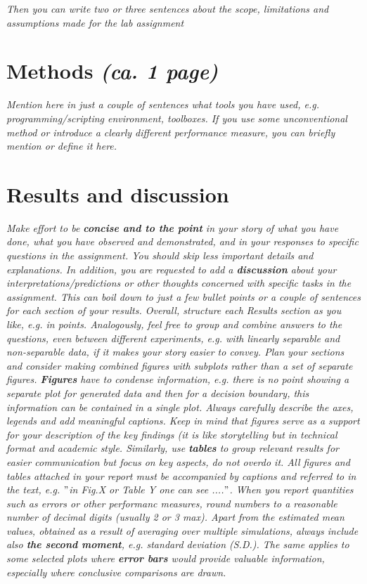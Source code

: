 \documentclass[a4paper]{article}
\begin{document}
\textit{Then you can write two or three sentences about the scope, limitations and assumptions made for the lab assignment}\\

\section{Methods \normalsize{\textit{(ca. 1 page)}}}
\textit{Mention here in just a couple of sentences what tools you have used, e.g. programming/scripting environment, toolboxes. If you use some unconventional method or introduce a clearly different performance measure, you can briefly mention or define it here.}\\

\section{Results and discussion}

\begin{framed}
\textit{Make effort to be \textbf{concise and to the point} in your story of what you have done, what you have observed and demonstrated, and in your responses to specific questions in the assignment. You should skip less important details and explanations. In addition, you are requested to add a \textbf{discussion} about your interpretations/predictions or other thoughts concerned with specific tasks in the assignment. This can boil down to just a few bullet points or a couple of sentences for each section of your results. 
Overall, structure each Results section as you like, e.g. in points. Analogously, feel free to group and combine answers to the questions, even between different experiments, e.g. with linearly separable and non-separable data, if it makes your story easier to convey. 
Plan your sections and consider making combined figures with subplots rather than a set of separate figures. \textbf{Figures} have to condense information, e.g. there is no point showing a separate plot for generated data and then for a decision boundary, this information can be contained in a single plot. Always carefully describe the axes, legends and add meaningful captions. Keep in mind that figures serve as a support for your description of the key findings (it is like storytelling but in technical format and academic style. 
Similarly, use \textbf{tables} to group relevant results for easier communication but focus on key aspects, do not overdo it. All figures and tables attached in your report must be accompanied by captions and referred to in the text, e.g. $"$in Fig.X or Table Y one can see ....$"$. 
When you report quantities such as errors or other performanc measures, round numbers to a reasonable number of decimal digits (usually 2 or 3 max). Apart from the estimated mean values, obtained as a result of averaging over multiple simulations, always include also \textbf{the second moment}, e.g. standard deviation (S.D.). The same applies to some selected plots where \textbf{error bars} would provide valuable information, especially where conclusive comparisons are drawn.} 
\end{framed}
\end{document}
